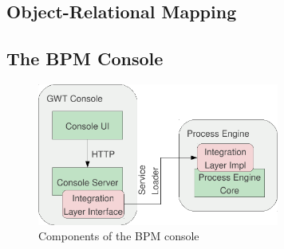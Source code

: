 \subsection{Object-Relational Mapping}

\subsection{The BPM Console}

\begin{figure}[H]
\centering
\includegraphics[width=300px,keepaspectratio]{bpm-console.pdf}
\caption{Components of the BPM console}
\label{fig:bpm-console}
\end{figure}
